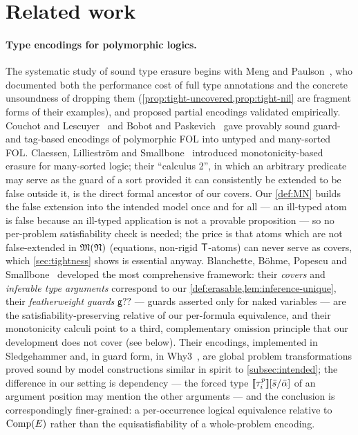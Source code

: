 \section{Related work}
\label{sec:related}

\paragraph{Type encodings for polymorphic logics.}
The systematic study of sound type erasure begins with Meng and
Paulson~\cite{MengPaulson2008}, who documented both the performance cost of
full type annotations and the concrete unsoundness of dropping them
(\cref{prop:tight-uncovered,prop:tight-nil} are fragment forms of their
examples), and proposed partial encodings validated empirically.  Couchot
and Lescuyer~\cite{CouchotLescuyer2007} and Bobot and
Paskevich~\cite{BobotPaskevich2011} gave provably sound guard- and
tag-based encodings of polymorphic FOL into untyped and many-sorted FOL.
Claessen, Lillieström and
Smallbone~\cite{ClaessenLilliestromSmallbone2011} introduced
monotonicity-based erasure for many-sorted logic; their ``calculus 2'', in
which an arbitrary predicate may serve as the guard of a sort provided it
can consistently be extended to be false outside it, is the direct formal
ancestor of our covers.  Our \cref{def:MN} builds the false extension into
the intended model once and for all --- an ill-typed atom is false because
an ill-typed application is not a provable proposition --- so no
per-problem satisfiability check is needed; the price is that atoms which
are not false-extended in $\mathfrak{M}(\mathfrak{N})$ (equations, non-rigid $\mathsf{T}$-atoms) can
never serve as covers, which \cref{sec:tightness} shows is essential
anyway.  Blanchette, B\"ohme, Popescu and
Smallbone~\cite{BlanchetteBohmePopescuSmallbone2016} developed the most
comprehensive framework: their \emph{covers} and \emph{inferable type
arguments} correspond to our \cref{def:erasable,lem:inference-unique},
their \emph{featherweight guards} $\mathsf{g}{?}{?}$ --- guards asserted
only for naked variables --- are the satisfiability-preserving relative of
our per-formula equivalence, and their monotonicity calculi point to a
third, complementary omission principle that our development does not
cover (see below).  Their encodings, implemented in Sledgehammer and, in
guard form, in Why3~\cite{FilliatrePaskevich2013}, are global problem
transformations proved sound by model constructions similar in spirit to
\cref{subsec:intended}; the difference in our setting is dependency ---
the forced type $[\![ \tau^p_i ]\!][\bar{s}/\bar{\alpha}]$ of an argument
position may mention the other arguments --- and the conclusion is
correspondingly finer-grained: a per-occurrence logical equivalence
relative to $\mathrm{Comp}(E)$ rather than the equisatisfiability of a whole-problem
encoding.

